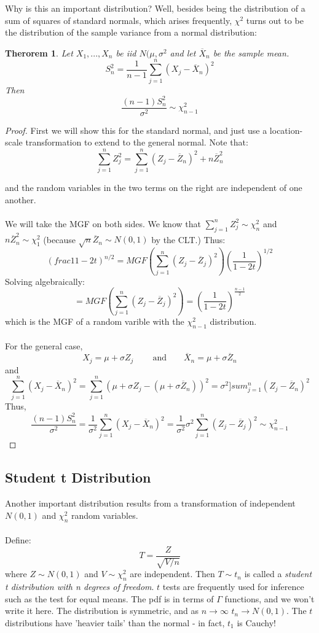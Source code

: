 \documentclass[12pt]{article} %
\newtheorem{thm}{Therorem}
\begin{document}
Why is this an important distribution? Well, besides being the distribution of a sum of squares of standard normals, which arises frequently, $\chi^2$ turns out to be the distribution of the sample variance from a normal distribution:

\begin{thm}
Let $X_1,...,X_n$ be iid $N(\mu,\sigma^2$ and let $\overline{X}_n$ be the sample mean.
$$S_n^2 = \frac{1}{n-1} \sum_{j=1}^n \left(X_j - \overline{X}_n\right)^2$$
Then 
$$\frac{\left(n-1\right)S_n^2}{\sigma^2}\sim \chi^2_{n-1}$$
\end{thm}
\begin{proof}
First we will show this for the standard normal, and just use a location-scale transformation to extend to the general normal. Note that:
$$\sum_{j=1}^n Z_j^2 = \sum_{j=1}^n \left(Z_j-\overline{Z}_n\right)^2 + n\overline{Z}_n^2$$

and the random variables in the two terms on the right are independent of one another. \\\\
We will take the MGF on both sides. We know that $\sum_{j=1}^n Z_j^2 \sim \chi_n^2$ and $n\overline{Z}_n^2 \sim \chi_1^2$ (because $\sqrt{n} \overline{Z}_n \sim N(0,1)$ by the CLT.)
Thus:
$$\left(frac{1}{1-2t}\right)^{n/2} = MGF\left(\sum_{j=1}^n \left(Z_j-\overline{Z}_j\right)^2\right) \left(\frac{1}{1-2t}\right)^{1/2}$$
Solving algebraically:
$$= MGF\left(\sum_{j=1}^n \left(Z_j-\overline{Z}_j\right)^2\right) = \left(\frac{1}{1-2t}\right)^{\frac{n-1}{2}}$$
which is the MGF of a random varible with the $\chi^2_{n-1}$ distribution.\\\\
For the general case, 
$$X_j= \mu +\sigma Z_j\;\;\;\;\;\;\ \textrm{ and } \;\;\;\;\;\; \overline{X}_n = \mu + \sigma \overline{Z}_n$$
and
$$\sum_{j=1}^n\left(X_j-\overline{X}_n\right)^2 = \sum_{j=1}^n \left(\mu+\sigma Z_j-(\mu+\sigma\overline{Z}_n)\right)^2 = \sigma^2]sum_{j=1}^n(Z_j-\overline{Z}_n)^2$$
Thus,
$$\frac{(n-1)S_n^2}{\sigma^2} = \frac1{\sigma^2}\sum_{j=1}^n\left(X_j-\overline{X}_n\right)^2 = \frac{1}{\sigma^2}\sigma^2\sum_{j=1}^n \left(Z_j-\overline{Z}_j\right)^2 \sim \chi^2_{n-1}$$
\end{proof}
\subsection{Student t Distribution}
Another important distribution results from a transformation of independent $N(0,1)$ and $\chi^2_n$ random variables. \\\\
Define:
$$T = \frac{Z}{\sqrt{V/n}}$$
where $Z\sim N(0,1)$ and $V\sim \chi^2_n$ are independent. Then $T\sim t_n$ is called a \emph{student t distribution with n degrees of freedom}. $t$ tests are frequently used for inference such as the test for equal means. The pdf is in terms of $\Gamma$ functions, and we won't write it here. The distribution is symmetric, and as $n\rightarrow\infty$ $t_n\rightarrow N(0,1)$. The $t$ distributions have 'heavier tails' than the normal - in fact, $t_1$ is Cauchy!
\end{document}
